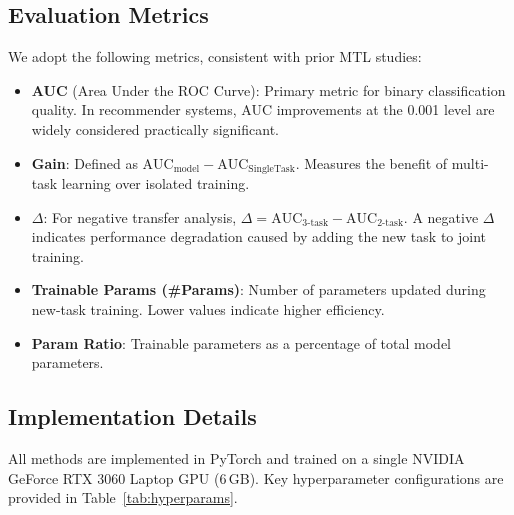 \documentclass[review,anonymous]{acmart}
\begin{document}
\subsection{Evaluation Metrics}

We adopt the following metrics, consistent with prior MTL studies:

\begin{itemize}
  \item \textbf{AUC} (Area Under the ROC Curve): Primary metric for binary
    classification quality. In recommender systems, AUC improvements at the
    0.001 level are widely considered practically significant.
  \item \textbf{Gain}: Defined as $\text{AUC}_{\text{model}} -
    \text{AUC}_{\text{SingleTask}}$. Measures the benefit of multi-task learning
    over isolated training.
  \item \textbf{$\Delta$}: For negative transfer analysis,
    $\Delta = \text{AUC}_{\text{3-task}} - \text{AUC}_{\text{2-task}}$.
    A negative $\Delta$ indicates performance degradation caused by adding the
    new task to joint training.
  \item \textbf{Trainable Params (\#Params)}: Number of parameters updated during
    new-task training. Lower values indicate higher efficiency.
  \item \textbf{Param Ratio}: Trainable parameters as a percentage of total model
    parameters.
\end{itemize}

\subsection{Implementation Details}

All methods are implemented in PyTorch and trained on a single NVIDIA GeForce
RTX 3060 Laptop GPU (6\,GB). Key hyperparameter configurations are provided in
Table~\ref{tab:hyperparams}.
\end{document}
